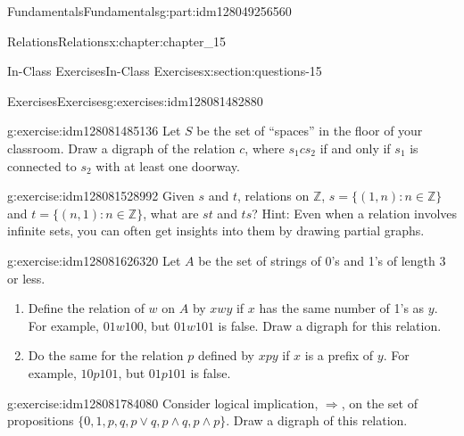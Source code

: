 \documentclass[oneside,10pt,]{book}
\numberwithin{equation}{section}
\begin{document}
\begin{partptx}{Fundamentals}{}{Fundamentals}{}{}{g:part:idm128049256560}
\begin{chapterptx}{Relations}{}{Relations}{}{}{x:chapter:chapter_15}
\begin{sectionptx}{In-Class Exercises}{}{In-Class Exercises}{}{}{x:section:questions-15}
%
\begin{exercises-subsection}{Exercises}{}{Exercises}{}{}{g:exercises:idm128081482880}
\par\medskip\noindent%
%
\begin{exercisegroup}
\begin{divisionexerciseeg}{1}{}{}{g:exercise:idm128081485136}%
Let \(S\) be the set of ``spaces'' in the floor of your classroom.   Draw a digraph of the relation \(c\), where \(s_1 c s_2\) if and only if \(s_1\) is connected to \(s_2\) with at least one doorway.%
\end{divisionexerciseeg}%
\begin{divisionexerciseeg}{2}{}{}{g:exercise:idm128081528992}%
Given \(s\) and \(t\), relations on \(\mathbb{Z}\), \(s = \{(1, n) : n \in \mathbb{Z}\}\) and \(t= \{(n, 1) : n \in  \mathbb{Z}\}\), what are \(st\) and \(ts\)? Hint: Even when a relation involves infinite sets, you can often get insights into them by drawing partial graphs.%
\end{divisionexerciseeg}%
\begin{divisionexerciseeg}{3}{}{}{g:exercise:idm128081626320}%
Let \(A\) be the set of strings of 0's and 1's of length 3 or less.%
\begin{enumerate}[label=(\alph*)]
\item{}Define the relation of \(w\) on \(A\) by \(x w y\) if \(x\) has the same number of 1's as \(y\). For example, \(01 w 100\), but \(01 w 101\) is false. Draw a digraph for this relation.%
\item{}Do the same for the relation \(p\) defined by \(x p y\) if \(x\) is a prefix of \(y\). For example, \(10 p 101\), but \(01 p 101\) is false.%
\end{enumerate}
%
\end{divisionexerciseeg}%
\begin{divisionexerciseeg}{4}{}{}{g:exercise:idm128081784080}%
Consider logical implication, \(\Rightarrow\), on the set of propositions \(\{0,1,p,q,p\lor q, p\land q, p\land p \}\). Draw a digraph of this relation.%
\end{divisionexerciseeg}%
\end{exercisegroup}
\par\medskip\noindent
\end{exercises-subsection}
\end{sectionptx}
\end{chapterptx}
%
\typeout{************************************************}
\typeout{************************************************}

\end{partptx}
\end{document}
